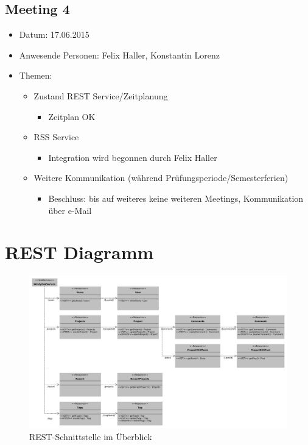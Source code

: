 \documentclass[12pt]{scrartcl}
\begin{document}
		\subsection{Meeting 4}
		\begin{itemize}
			\item Datum: 17.06.2015
			\item Anwesende Personen: Felix Haller, Konstantin Lorenz
			\item Themen:
			\begin{itemize}
				\item Zustand REST Service/Zeitplanung
				\begin{itemize}
					\item Zeitplan OK
				\end{itemize}
				\item RSS Service
				\begin{itemize}
					\item Integration wird begonnen durch Felix Haller
				\end{itemize}
				\item Weitere Kommunikation (während Prüfungsperiode/Semesterferien)
				\begin{itemize}
					\item Beschluss: bis auf weiteres keine weiteren Meetings, Kommunikation über e-Mail
				\end{itemize}
			\end{itemize}
		\end{itemize}
		\section{REST Diagramm} \label{sec:restdiagramm}
			\begin{landscape}
			 \begin{figure}
			  \centering
			  \includegraphics[width=\linewidth,height=\textheight,keepaspectratio]{Bilder/rest.pdf} 
			  \caption{REST-Schnittstelle im Überblick}
			  \label{fig:rest}
			 \end{figure}
			\end{landscape}
\end{document}
